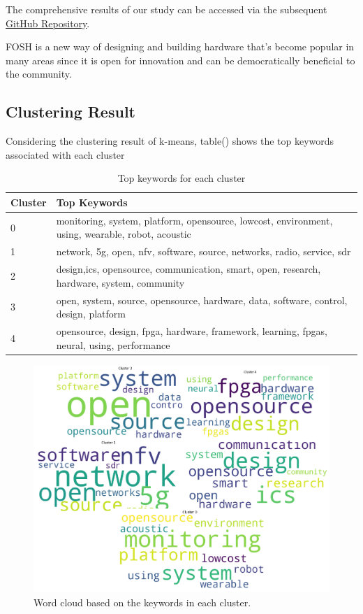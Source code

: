 \documentclass[final-report.tex]{subfiles}
\begin{document}
The comprehensive results of our study can be accessed via the subsequent
\href{https://github.com/aliraeisdanaei/FOSH_Lit_Review}{GitHub Repository}.


FOSH is a new way of designing and building hardware that's become popular in many areas since it is open for innovation and can be democratically beneficial to the community. 
\subsection{Clustering Result}
Considering the clustering result of k-means, table() shows the top keywords associated with each cluster


\begin{table}[h!]
\centering
\begin{tabularx}{0.9\linewidth}{@{}lX@{}}
\toprule
Cluster & Top Keywords \\ \midrule
0       & monitoring, system, platform, opensource, lowcost, environment, using, wearable, robot, acoustic \\
1       & network, 5g, open, nfv, software, source, networks, radio, service, sdr \\
2       & design,ics, opensource, communication, smart, open, research, hardware, system, community \\
3       & open, system, source, opensource, hardware, data, software, control, design, platform \\
4       & opensource, design, fpga, hardware, framework, learning, fpgas, neural, using, performance \\ \bottomrule
\end{tabularx}
\caption{Top keywords for each cluster}
\label{tab:cluster_keywords}
\end{table}

\begin{figure}[!h]
    \begin{minipage}{0.5\textwidth}
        \centering
        \includegraphics[width=\textwidth]{../Images/wordcloud.png}
        \caption{Word cloud based on the keywords in each cluster.}
        \label{fig:1}
    \end{minipage}
\end{figure}
\end{document}
